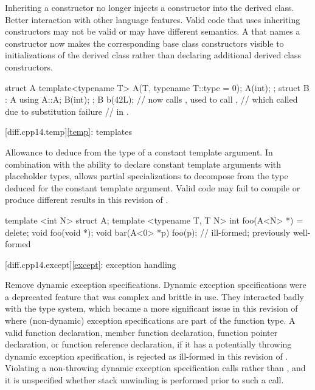 \change
Inheriting a constructor no longer injects a constructor into the derived class.
\rationale
Better interaction with other language features.
\effect
Valid \CppXIV{} code that uses inheriting constructors may not be valid
or may have different semantics. A 
that names a constructor now makes the corresponding base class constructors
visible to initializations of the derived class
rather than declaring additional derived class constructors.
\begin{example}
\begin{codeblock}
struct A {
  template<typename T> A(T, typename T::type = 0);
  A(int);
};
struct B : A {
  using A::A;
  B(int);
};
B b(42L);           // now calls , used to call ,
                    // which called  due to substitution failure
                    // in .
\end{codeblock}
\end{example}

[diff.cpp14.temp]{\ref{temp}: templates}

\change
Allowance to deduce from the type of a constant template argument.
\rationale
In combination with the ability to declare
constant template arguments with placeholder types,
allows partial specializations to decompose
from the type deduced for the constant template argument.
\effect
Valid \CppXIV{} code may fail to compile
or produce different results in this revision of \Cpp{}.
\begin{example}
\begin{codeblock}
template <int N> struct A;
template <typename T, T N> int foo(A<N> *) = delete;
void foo(void *);
void bar(A<0> *p) {
  foo(p);           // ill-formed; previously well-formed
}
\end{codeblock}
\end{example}

[diff.cpp14.except]{\ref{except}: exception handling}

\change
Remove dynamic exception specifications.
\rationale
Dynamic exception specifications were a deprecated feature
that was complex and brittle in use.
They interacted badly with the type system,
which became a more significant issue in this revision of \Cpp{}
where (non-dynamic) exception specifications are part of the function type.
\effect
A valid \CppXIV{} function declaration,
member function declaration,
function pointer declaration,
or function reference declaration,
if it has a potentially throwing dynamic exception specification,
is rejected as ill-formed in this revision of \Cpp{}.
Violating a non-throwing dynamic exception specification
calls  rather than ,
and it is unspecified whether stack unwinding is performed
prior to such a call.

